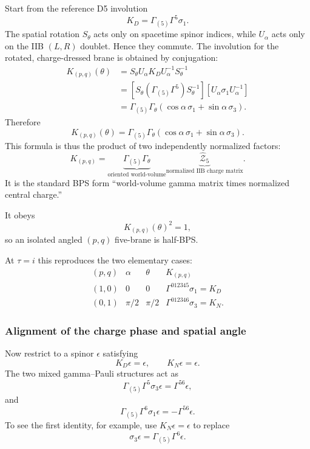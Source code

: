 \documentclass[
  10pt,
  a4paper,
  openany]{book}
\begin{document}
Start from the reference D5 involution \[
K_D=\Gamma_{(5)}\Gamma^5\sigma_1.
\] The spatial rotation \(S_\theta\) acts only on spacetime spinor
indices, while \(U_\alpha\) acts only on the IIB \((L,R)\) doublet.
Hence they commute. The involution for the rotated, charge-dressed brane
is obtained by conjugation: \[
\begin{aligned}
K_{(p,q)}(\theta)
&=S_\theta U_\alpha K_DU_\alpha^{-1}S_\theta^{-1}\\
&=
\left[
S_\theta(\Gamma_{(5)}\Gamma^5)S_\theta^{-1}
\right]
\left[
U_\alpha\sigma_1U_\alpha^{-1}
\right]\\
&=\Gamma_{(5)}\Gamma_\theta
\left(
\cos\alpha\,\sigma_1+\sin\alpha\,\sigma_3
\right).
\end{aligned}
\] Therefore \[
\boxed{
K_{(p,q)}(\theta)
=\Gamma_{(5)}\Gamma_\theta
\left(
\cos\alpha\,\sigma_1+\sin\alpha\,\sigma_3
\right)
}.
\] This formula is thus the product of two independently normalized
factors: \[
\boxed{
K_{(p,q)}
=
\underbrace{\Gamma_{(5)}\Gamma_\theta}_{\text{oriented world-volume}}
\underbrace{\widehat{\mathcal Z}_5}_{\text{normalized IIB charge matrix}}
}.
\] It is the standard BPS form ``world-volume gamma matrix times
normalized central charge.''

It obeys \[
K_{(p,q)}(\theta)^2=1,
\] so an isolated angled \((p,q)\) five-brane is half-BPS.

At \(\tau=i\) this reproduces the two elementary cases: \[
\begin{array}{c|c|c|c}
(p,q)&\alpha&\theta&K_{(p,q)}\\ \hline
(1,0)&0&0&\Gamma^{012345}\sigma_1=K_D\\
(0,1)&\pi/2&\pi/2&\Gamma^{012346}\sigma_3=K_N.
\end{array}
\]

\subsubsection{Alignment of the charge phase and spatial
angle}\label{alignment-of-the-charge-phase-and-spatial-angle}

Now restrict to a spinor \(\epsilon\) satisfying \[
K_D\epsilon=\epsilon,
\qquad
K_N\epsilon=\epsilon.
\] The two mixed gamma--Pauli structures act as \[
\Gamma_{(5)}\Gamma^5\sigma_3\epsilon
=\Gamma^{56}\epsilon,
\] and \[
\Gamma_{(5)}\Gamma^6\sigma_1\epsilon
=-\Gamma^{56}\epsilon.
\] To see the first identity, for example, use \(K_N\epsilon=\epsilon\)
to replace \[
\sigma_3\epsilon=\Gamma_{(5)}\Gamma^6\epsilon.
\]
\end{document}
